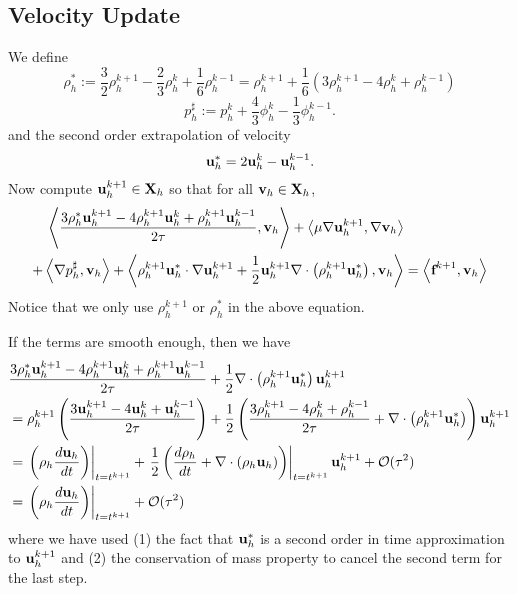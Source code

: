 \documentclass[letterpaper]{erdc}
\begin{document}
\subsection{Velocity Update}
We define
\begin{equation}
  \rho_h^{*} := \frac{3}{2}\rho_h^{k+1} - \frac{2}{3}\rho_h^{k} + \frac{1}{6}\rho_h^{k-1} = \rho_h^{k+1} + \frac{1}{6}\left(3\rho_h^{k+1} -4\rho_h^{k} + \rho_h^{k-1} \right)
\end{equation}
\begin{equation}
  p_h^{\sharp} := p_h^{k} + \frac{4}{3}\phi_h^{k} - \frac{1}{3}\phi_h^{k-1}.
\end{equation}
and the second order extrapolation of velocity
\begin{equation}
  \textbf{u}^{*}_h = 2\textbf{u}_h^{k}  - \textbf{u}_h^{k-1}.
\end{equation}
Now compute $\textbf{u}_h^{k+1}\in\textbf{X}_h$ so that for all $\textbf{v}_h\in\textbf{X}_h$,
\begin{equation}
  \begin{split}
    \left\langle \frac{3\rho_h^{*}\textbf{u}_h^{k+1} - 4\rho_h^{k+1}\textbf{u}_h^{k} + \rho_h^{k+1}\textbf{u}_h^{k-1}}{2\tau}, \textbf{v}_h \right\rangle  + \left\langle \mu\nabla\textbf{u}_h^{k+1}, \nabla\textbf{v}_h \right\rangle &\\
   + \left\langle \nabla p_h^{\sharp}, \textbf{v}_h \right\rangle + \left\langle \rho_h^{k+1}\textbf{u}_h^{*}\cdot\nabla\textbf{u}_h^{k+1} + \frac{1}{2}\textbf{u}_h^{k+1}\nabla\cdot\left( \rho_h^{k+1}\textbf{u}_h^{*} \right), \textbf{v}_h \right\rangle &= \left\langle \textbf{f}^{k+1}, \textbf{v}_h \right\rangle
  \end{split}
\end{equation}
Notice that we only use $\rho_h^{k+1}$ or $\rho_h^{*}$ in the above equation.

\begin{remark}
If the terms are smooth enough, then we have
\begin{align}
  &\frac{3\rho_h^{*}\textbf{u}_h^{k+1}-4\rho_h^{k+1}\textbf{u}_h^{k} +\rho_h^{k+1}\textbf{u}_h^{k-1}}{2\tau} +\frac{1}{2}\nabla\cdot\left(\rho_h^{k+1}\textbf{u}_h^{*}\right)\textbf{u}_h^{k+1}\\
   &= \rho_h^{k+1}\left(\frac{3\textbf{u}_h^{k+1} - 4\textbf{u}_h^{k} + \textbf{u}_h^{k-1}}{2\tau}\right) + \frac{1}{2} \left( \frac{3\rho_h^{k+1} -4\rho_h^{k} + \rho_h^{k-1}}{2\tau} + \nabla\cdot\left(\rho_h^{k+1}\textbf{u}_h^{*}\right)\right)\textbf{u}_h^{k+1}\\
  &= \left.\left(\rho_h\frac{d\textbf{u}_h}{dt} \right)\right|_{t=t^{k+1}} + \left.\frac{1}{2} \left( \frac{d\rho_h}{dt} +\nabla\cdot\left(\rho_h\textbf{u}_h\right)\right)\right|_{t=t^{k+1}}\textbf{u}_h^{k+1} + \mathcal{O}(\tau^2)\\
  &=\left.\left(\rho_h\frac{d\textbf{u}_h}{dt} \right)\right|_{t=t^{k+1}} + \mathcal{O}(\tau^{2})
\end{align}
where we have used (1) the fact that $\textbf{u}_h^{*}$ is a second order in time approximation to $\textbf{u}_h^{k+1}$ and (2) the conservation of mass property to cancel the second term for the last step.
\end{remark}
\end{document}
